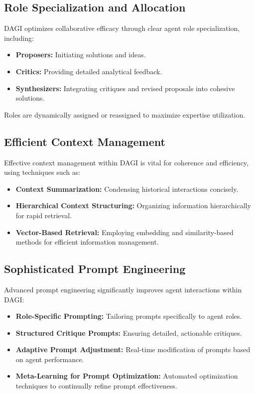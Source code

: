 \documentclass[12pt]{amsart}
\begin{document}
\subsection{Role Specialization and Allocation}

DAGI optimizes collaborative efficacy through clear agent role specialization, including:

\begin{itemize}
\item \textbf{Proposers:} Initiating solutions and ideas.
\item \textbf{Critics:} Providing detailed analytical feedback.
\item \textbf{Synthesizers:} Integrating critiques and revised proposals into cohesive solutions.
\end{itemize}

Roles are dynamically assigned or reassigned to maximize expertise utilization.

\subsection{Efficient Context Management}

Effective context management within DAGI is vital for coherence and efficiency, using techniques such as:

\begin{itemize}
\item \textbf{Context Summarization:} Condensing historical interactions concisely.
\item \textbf{Hierarchical Context Structuring:} Organizing information hierarchically for rapid retrieval.
\item \textbf{Vector-Based Retrieval:} Employing embedding and similarity-based methods for efficient information management.
\end{itemize}

\subsection{Sophisticated Prompt Engineering}

Advanced prompt engineering significantly improves agent interactions within DAGI:

\begin{itemize}
\item \textbf{Role-Specific Prompting:} Tailoring prompts specifically to agent roles.
\item \textbf{Structured Critique Prompts:} Ensuring detailed, actionable critiques.
\item \textbf{Adaptive Prompt Adjustment:} Real-time modification of prompts based on agent performance.
\item \textbf{Meta-Learning for Prompt Optimization:} Automated optimization techniques to continually refine prompt effectiveness.
\end{itemize}
\end{document}
